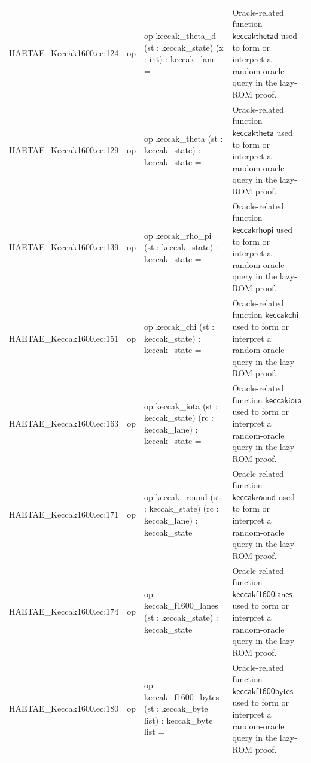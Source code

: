 \documentclass[10pt]{article}
\begin{document}
\begin{longtable}{L{0.11\textwidth}L{0.055\textwidth}L{0.385\textwidth}L{0.41\textwidth}}
HAETAE\_\allowbreak{}Keccak1600.\allowbreak{}ec:\allowbreak{}124 & op & {\ttfamily\scriptsize op keccak\_\allowbreak{}theta\_\allowbreak{}d (st : keccak\_\allowbreak{}state) (x : int) : keccak\_\allowbreak{}lane =} & Oracle-related function $\mathsf{keccakthetad}$ used to form or interpret a random-oracle query in the lazy-ROM proof. \\
HAETAE\_\allowbreak{}Keccak1600.\allowbreak{}ec:\allowbreak{}129 & op & {\ttfamily\scriptsize op keccak\_\allowbreak{}theta (st : keccak\_\allowbreak{}state) : keccak\_\allowbreak{}state =} & Oracle-related function $\mathsf{keccaktheta}$ used to form or interpret a random-oracle query in the lazy-ROM proof. \\
HAETAE\_\allowbreak{}Keccak1600.\allowbreak{}ec:\allowbreak{}139 & op & {\ttfamily\scriptsize op keccak\_\allowbreak{}rho\_\allowbreak{}pi (st : keccak\_\allowbreak{}state) : keccak\_\allowbreak{}state =} & Oracle-related function $\mathsf{keccakrhopi}$ used to form or interpret a random-oracle query in the lazy-ROM proof. \\
HAETAE\_\allowbreak{}Keccak1600.\allowbreak{}ec:\allowbreak{}151 & op & {\ttfamily\scriptsize op keccak\_\allowbreak{}chi (st : keccak\_\allowbreak{}state) : keccak\_\allowbreak{}state =} & Oracle-related function $\mathsf{keccakchi}$ used to form or interpret a random-oracle query in the lazy-ROM proof. \\
HAETAE\_\allowbreak{}Keccak1600.\allowbreak{}ec:\allowbreak{}163 & op & {\ttfamily\scriptsize op keccak\_\allowbreak{}iota (st : keccak\_\allowbreak{}state) (rc : keccak\_\allowbreak{}lane) : keccak\_\allowbreak{}state =} & Oracle-related function $\mathsf{keccakiota}$ used to form or interpret a random-oracle query in the lazy-ROM proof. \\
HAETAE\_\allowbreak{}Keccak1600.\allowbreak{}ec:\allowbreak{}171 & op & {\ttfamily\scriptsize op keccak\_\allowbreak{}round (st : keccak\_\allowbreak{}state) (rc : keccak\_\allowbreak{}lane) : keccak\_\allowbreak{}state =} & Oracle-related function $\mathsf{keccakround}$ used to form or interpret a random-oracle query in the lazy-ROM proof. \\
HAETAE\_\allowbreak{}Keccak1600.\allowbreak{}ec:\allowbreak{}174 & op & {\ttfamily\scriptsize op keccak\_\allowbreak{}f1600\_\allowbreak{}lanes (st : keccak\_\allowbreak{}state) : keccak\_\allowbreak{}state =} & Oracle-related function $\mathsf{keccakf1600lanes}$ used to form or interpret a random-oracle query in the lazy-ROM proof. \\
HAETAE\_\allowbreak{}Keccak1600.\allowbreak{}ec:\allowbreak{}180 & op & {\ttfamily\scriptsize op keccak\_\allowbreak{}f1600\_\allowbreak{}bytes (st : keccak\_\allowbreak{}byte list) : keccak\_\allowbreak{}byte list =} & Oracle-related function $\mathsf{keccakf1600bytes}$ used to form or interpret a random-oracle query in the lazy-ROM proof. \\

\end{longtable}
\end{document}
